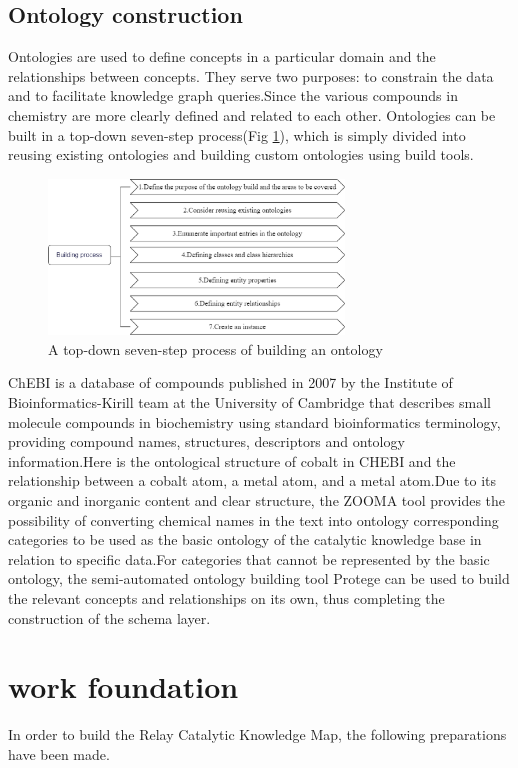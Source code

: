 \documentclass[%
 aip,
 jmp,%
 amsmath,amssymb,
 reprint,%
]{revtex4-2}
\begin{document}
\subsection{Ontology construction}
Ontologies are used to define concepts in a particular domain and the relationships between concepts. They serve two purposes: to constrain 
the data and to facilitate knowledge graph queries.Since the various compounds in chemistry are more clearly defined and related to each other.
Ontologies can be built in a top-down seven-step process(Fig \ref{ Fig.4 }), which is simply divided 
into reusing existing ontologies and building custom ontologies using build tools.
\begin{figure}[htbp]
 \centering
 \includegraphics[width=0.7\textwidth]{figure/4.png}
 \caption{ A top-down seven-step process of building an ontology }
 \label{ Fig.4 }
\end{figure}

ChEBI is a database of compounds published in 2007 by the Institute of Bioinformatics-Kirill team at the University of Cambridge that 
describes small molecule compounds in biochemistry using standard bioinformatics terminology, providing compound names, structures, 
descriptors and ontology information.Here is the ontological structure of cobalt in CHEBI and the relationship between a cobalt atom, 
a metal atom, and a metal atom.Due to its organic and inorganic content and clear structure, the ZOOMA tool provides the possibility 
of converting chemical names in the text into ontology corresponding categories to be used as the basic ontology of the catalytic 
knowledge base in relation to specific data.For categories that cannot be represented by the basic ontology, the semi-automated ontology 
building tool Protege can be used to build the relevant concepts and relationships on its own, thus completing the construction of the 
schema layer.

\section{work foundation}
In order to build the Relay Catalytic Knowledge Map, the following preparations have been made.
\end{document}
